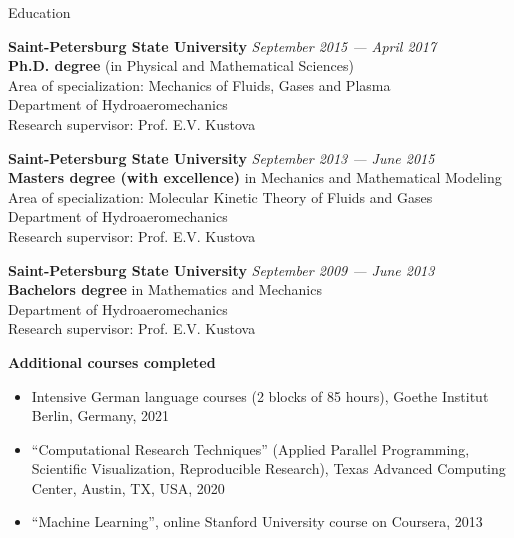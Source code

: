 \documentclass{resume} %
\begin{document}
\begin{rSection}{Education}

{\bf Saint-Petersburg State University} \hfill {\em September 2015 --- April 2017} \\ 
\textbf{Ph.D. degree} (in Physical and Mathematical Sciences)\\
Area of specialization: Mechanics of Fluids, Gases and Plasma \smallskip  \\
Department of Hydroaeromechanics \\
Research supervisor: Prof. E.V. Kustova

{\bf Saint-Petersburg State University} \hfill {\em September 2013 --- June 2015} \\ 
\textbf{Masters degree (with excellence)} in Mechanics and Mathematical Modeling\\
Area of specialization: Molecular Kinetic Theory of Fluids and Gases\smallskip \\
Department of Hydroaeromechanics \\
Research supervisor: Prof. E.V. Kustova 

{\bf Saint-Petersburg State University} \hfill {\em September 2009 --- June 2013} \\ 
\textbf{Bachelors degree} in Mathematics and Mechanics \smallskip \\
Department of Hydroaeromechanics \\
Research supervisor: Prof. E.V. Kustova
\end{rSection}

{\bf Additional courses completed}
\begin{itemize}
    \item Intensive German language courses (2 blocks of 85 hours), Goethe Institut Berlin, Germany, 2021
    \item ``Computational Research Techniques'' (Applied Parallel Programming, Scientific Visualization, Reproducible Research), Texas Advanced Computing Center, Austin, TX, USA, 2020
    \item ``Machine Learning'', online Stanford University course on Coursera, 2013
\end{itemize}

\end{document}

